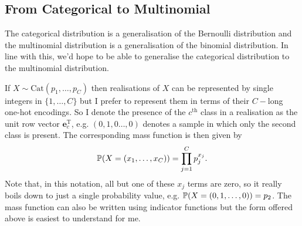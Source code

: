 \documentclass[11pt]{article}
\begin{document}
\begin{appendices}
\subsection{From Categorical to Multinomial}
The categorical distribution is a generalisation of the Bernoulli distribution and the multinomial distribution is a generalisation of the binomial distribution. In line with this, we'd hope to be able to generalise the categorical distribution to the multinomial distribution.

If $X\sim\text{Cat}(p_1,\dots,p_C)$ then realisations of $X$ can be represented by single integers in $\{1,\dots,C\}$ but I prefer to represent them in terms of their $C-$long one-hot encodings. So I denote the presence of the $c^{\text{th}}$ class in a realisation as the unit row vector $\mathbf{e}_c^{\text{T}}$, e.g. $(0,1,0\dots,0)$ denotes a sample in which only the second class is present. The corresponding mass function is then given by
$$
\P(X=(x_1,\dots,x_C))
=
\prod_{j=1}^Cp_j^{x_j}.
$$
Note that, in this notation, all but one of these $x_j$ terms are zero, so it really boils down to just a single probability value, e.g. $\P(X=(0,1,\dots,0))=p_2$. The mass function can also be written using indicator functions but the form offered above is easiest to understand for me.


\end{appendices}
\end{document}
